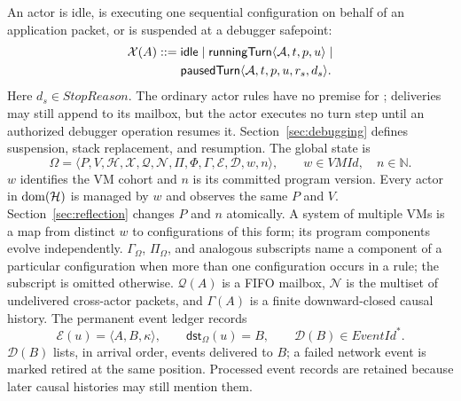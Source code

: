 An actor is idle, is executing one sequential configuration on behalf of an
application packet, or is suspended at a debugger safepoint:
\begin{equation}\label{eq:actor-run-state}
 \begin{aligned}
 \mathcal X(A)::={}&\mathsf{idle}\mid
   \mathsf{runningTurn}\langle\mathcal A,t,p,u\rangle\mid\\
 &\mathsf{pausedTurn}\langle\mathcal A,t,p,u,r_s,d_s\rangle.
 \end{aligned}
\end{equation}
Here $d_s\in\mathit{StopReason}$.  The ordinary actor rules have no premise
for ; deliveries may still append to its mailbox, but the actor
executes no turn step until an authorized debugger operation resumes it.
Section~\ref{sec:debugging} defines suspension, stack replacement, and
resumption.
The global state is
\begin{equation}\label{eq:actor-configuration}
 \Omega=\langle P,V,\mathcal H,\mathcal X,\mathcal Q,\mathcal N,
              \Pi,\Phi,\Gamma,\mathcal E,\mathcal D,w,n\rangle,
 \qquad w\in\mathit{VMId},\quad n\in\mathbb N.
\end{equation}
$w$ identifies the VM cohort and $n$ is its committed program version.  Every
actor in $\mathop{\mathrm{dom}}(\mathcal H)$ is managed by $w$ and observes the same $P$ and
$V$.  Section~\ref{sec:reflection} changes $P$ and $n$ atomically.  A system of
multiple VMs is a map from distinct $w$ to configurations of this form; its
program components evolve independently.
$\Gamma_\Omega$, $\Pi_\Omega$, and analogous subscripts name a component of a
particular configuration when more than one configuration occurs in a rule;
the subscript is omitted otherwise.
$\mathcal Q(A)$ is a FIFO mailbox, $\mathcal N$ is the multiset of undelivered
cross-actor packets, and $\Gamma(A)$ is a finite downward-closed causal
history.  The permanent event ledger records
\begin{equation}\label{eq:event-ledger}
 \mathcal E(u)=\langle A,B,\kappa\rangle,\qquad
 \mathsf{dst}_{\Omega}(u)=B,\qquad
 \mathcal D(B)\in\mathit{EventId}^{*}.
\end{equation}
$\mathcal D(B)$ lists, in arrival order, events delivered to $B$; a failed
network event is marked retired at the same position.  Processed event records
are retained because later causal histories may still mention them.


